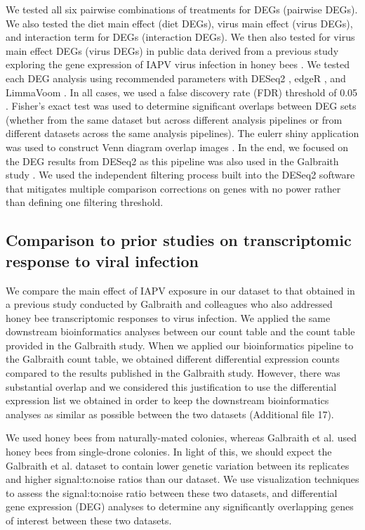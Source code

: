 \documentclass{bmcart}
\begin{document}
\begin{linenumbers}
\begin{doublespacing}
We tested all six pairwise combinations of treatments for DEGs (pairwise DEGs). We also tested the diet main effect (diet DEGs), virus main effect (virus DEGs), and interaction term for DEGs (interaction DEGs). We then also tested for virus main effect DEGs (virus DEGs) in public data derived from a previous study exploring the gene expression of IAPV virus infection in honey bees \cite{galbraith}. We tested each DEG analysis using recommended parameters with DESeq2 \cite{deseq2}, edgeR \cite{edger}, and LimmaVoom \cite{limma}. In all cases, we used a false discovery rate (FDR) threshold of 0.05 \cite{benjamini}. Fisher's exact test was used to determine significant overlaps between DEG sets (whether from the same dataset but across different analysis pipelines or from different datasets across the same analysis pipelines). The eulerr shiny application was used to construct Venn diagram overlap images \cite{euler}. In the end, we focused on the DEG results from DESeq2 \cite{deseq2} as this pipeline was also used in the Galbraith study \cite{galbraith}. We used the independent filtering process built into the DESeq2 software that mitigates multiple comparison corrections on genes with no power rather than defining one filtering threshold.

\subsection*{Comparison to prior studies on transcriptomic response to viral infection}

We compare the main effect of IAPV exposure in our dataset to that obtained in a previous study conducted by Galbraith and colleagues \cite{galbraith} who also addressed honey bee transcriptomic responses to virus infection. We applied the same downstream bioinformatics analyses between our count table and the count table provided in the Galbraith study. When we applied our bioinformatics pipeline to the Galbraith count table, we obtained different differential expression counts compared to the results published in the Galbraith study. However, there was substantial overlap and we considered this justification to use the differential expression list we obtained in order to keep the downstream bioinformatics analyses as similar as possible between the two datasets (Additional file 17). 

We used honey bees from naturally-mated colonies, whereas Galbraith et al. \cite{galbraith} used honey bees from single-drone colonies. In light of this, we should expect the Galbraith et al. dataset to contain lower genetic variation between its replicates and higher signal:to:noise ratios than our dataset. We use visualization techniques to assess the signal:to:noise ratio between these two datasets, and differential gene expression (DEG) analyses to determine any significantly overlapping genes of interest between these two datasets.


\end{doublespacing}
\end{linenumbers}
\end{document}
